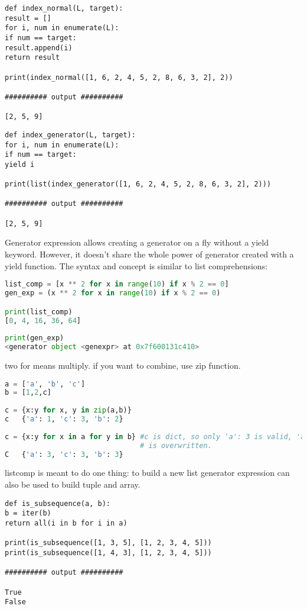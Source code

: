 \documentclass[a4paper,12pt,twoside]{book}
\begin{document}
\begin{lstlisting}
def index_normal(L, target):
result = []
for i, num in enumerate(L):
if num == target:
result.append(i)
return result

print(index_normal([1, 6, 2, 4, 5, 2, 8, 6, 3, 2], 2))

########## output ##########

[2, 5, 9]
\end{lstlisting}

\begin{lstlisting}
def index_generator(L, target):
for i, num in enumerate(L):
if num == target:
yield i

print(list(index_generator([1, 6, 2, 4, 5, 2, 8, 6, 3, 2], 2)))

########## output ##########

[2, 5, 9]
\end{lstlisting}


Generator expression allows creating a generator on a fly without a yield keyword. However, it doesn’t share the whole power of generator created with a yield function. The syntax and concept is similar to list comprehensions:
\begin{lstlisting}[frame=single, language=Python]
list_comp = [x ** 2 for x in range(10) if x % 2 == 0]
gen_exp = (x ** 2 for x in range(10) if x % 2 == 0)

print(list_comp)
[0, 4, 16, 36, 64]
	
print(gen_exp)
<generator object <genexpr> at 0x7f600131c410>  
\end{lstlisting}  
	
two for means multiply. if you want to combine, use zip function. 
\begin{lstlisting}[frame=single, language=Python]	
a = ['a', 'b', 'c']
b = [1,2,c]
	
c = {x:y for x, y in zip(a,b)}
c	{'a': 1, 'c': 3, 'b': 2}
	
c = {x:y for x in a for y in b} #c is dict, so only 'a': 3 is valid, 'a':1
                                # is overwritten.
C	{'a': 3, 'c': 3, 'b': 3}
\end{lstlisting}  	
		
listcomp is meant to do one thing: to build a new list
generator expression can also be used to build tuple and array.


\begin{lstlisting}
def is_subsequence(a, b):
b = iter(b)
return all(i in b for i in a)

print(is_subsequence([1, 3, 5], [1, 2, 3, 4, 5]))
print(is_subsequence([1, 4, 3], [1, 2, 3, 4, 5]))

########## output ##########

True
False
\end{lstlisting}
\end{document}
